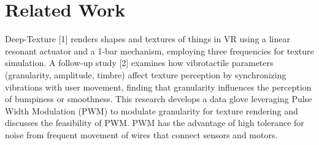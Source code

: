 \documentclass[a4paper,twocolumn]{article}
\begin{document}

\section{Related Work}
Deep-Texture [1] renders shapes and textures of things in VR using a linear resonant actuator and a 1-bar mechanism, employing three frequencies for texture simulation. A follow-up study [2] examines how vibrotactile parameters (granularity, amplitude, timbre) affect texture perception by synchronizing vibrations with user movement, finding that granularity influences the perception of bumpiness or smoothness. This research develops a data glove leveraging Pulse Width Modulation (PWM) to modulate granularity for texture rendering and discusses the feasibility of PWM. PWM has the advantage of high tolerance for noise from frequent movement of wires that connect sensors and motors.
\end{document}
